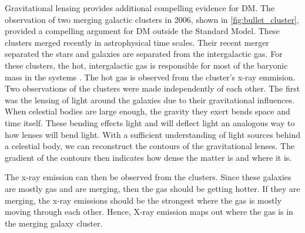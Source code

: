 \begin{figure}[ht]
\end{figure}

Gravitational lensing provides additional compelling evidence for DM.
The observation of two merging galactic clusters in 2006, shown in \cref{fig:bullet_cluster}, provided a compelling argument for DM outside the Standard Model.
These clusters merged recently in astrophysical time scales.
Their recent merger separated the stars and galaxies are separated from the intergalactic gas.
For these clusters, the hot, intergalactic gas is responsible for most of the baryonic mass in the systems \cite{Hooper:DMHistory}.
The hot gas is observed from the cluster's x-ray emmision.
Two observations of the clusters were made independently of each other.
The first was the lensing of light around the galaxies due to their gravitational influences.
When celestial bodies are large enough, the gravity they exert bends space and time itself.
These bending effects light and will deflect light an analogous way to how lenses will bend light.
With a sufficient understanding of light sources behind a celestial body, we can reconstruct the contours of the gravitational lenses.
The gradient of the contours then indicates how dense the matter is and where it is.

The x-ray emission can then be observed from the clusters.
Since these galaxies are mostly gas and are merging, then the gas should be getting hotter.
If they are merging, the x-ray emissions should be the strongest where the gas is mostly moving through each other.
Hence, X-ray emission maps out where the gas is in the merging galaxy cluster.

